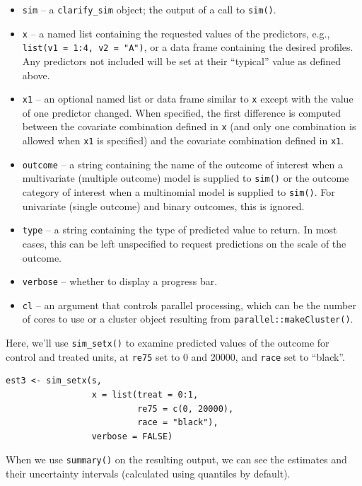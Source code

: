 \begin{itemize}
\item
  \texttt{sim} -- a \texttt{clarify\_sim} object; the output of a call to \texttt{sim()}.
\item
  \texttt{x} -- a named list containing the requested values of the predictors, e.g., \texttt{list(v1\ =\ 1:4,\ v2\ =\ "A")}, or a data frame containing the desired profiles. Any predictors not included will be set at their ``typical'' value as defined above.
\item
  \texttt{x1} -- an optional named list or data frame similar to \texttt{x} except with the value of one predictor changed. When specified, the first difference is computed between the covariate combination defined in \texttt{x} (and only one combination is allowed when \texttt{x1} is specified) and the covariate combination defined in \texttt{x1}.
\item
  \texttt{outcome} -- a string containing the name of the outcome of interest when a multivariate (multiple outcome) model is supplied to \texttt{sim()} or the outcome category of interest when a multinomial model is supplied to \texttt{sim()}. For univariate (single outcome) and binary outcomes, this is ignored.
\item
  \texttt{type} -- a string containing the type of predicted value to return. In most cases, this can be left unspecified to request predictions on the scale of the outcome.
\item
  \texttt{verbose} -- whether to display a progress bar.
\item
  \texttt{cl} -- an argument that controls parallel processing, which can be the number of cores to use or a cluster object resulting from \texttt{parallel::makeCluster()}.
\end{itemize}

Here, we'll use \texttt{sim\_setx()} to examine predicted values of the outcome for control and treated units, at \texttt{re75} set to 0 and 20000, and \texttt{race} set to ``black''.

\begin{verbatim}
est3 <- sim_setx(s,
                 x = list(treat = 0:1,
                          re75 = c(0, 20000),
                          race = "black"),
                 verbose = FALSE)
\end{verbatim}

When we use \texttt{summary()} on the resulting output, we can see the estimates and their uncertainty intervals (calculated using quantiles by default).

